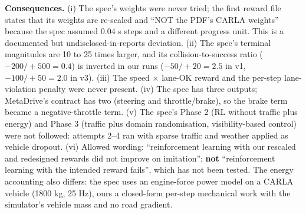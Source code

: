 \documentclass[10.5pt,a4paper]{article}
\begin{document}
\textbf{Consequences.} (i) The spec's weights were never tried; the first reward file states that its weights are re-scaled and ``NOT the PDF's CARLA weights'' because the spec assumed 0.04 s steps and a different progress unit. This is a documented but undisclosed-in-reports deviation. (ii) The spec's terminal magnitudes are 10 to 25 times larger, and its collision-to-success ratio ($-200/+500=0.4$) is inverted in our runs ($-50/+20=2.5$ in v1, $-100/+50=2.0$ in v3). (iii) The speed $\times$ lane-OK reward and the per-step lane-violation penalty were never present. (iv) The spec has three outputs; MetaDrive's contract has two (steering and throttle/brake), so the brake term became a negative-throttle term. (v) The spec's Phase 2 (RL without traffic plus energy) and Phase 3 (traffic plus domain randomisation, visibility-based control) were not followed: attempts 2--4 ran with sparse traffic and weather applied as vehicle dropout. (vi) Allowed wording: ``reinforcement learning with our rescaled and redesigned rewards did not improve on imitation''; \textbf{not} ``reinforcement learning with the intended reward fails'', which has not been tested. The energy accounting also differs: the spec uses an engine-force power model on a CARLA vehicle (1800 kg, 25 Hz), ours a closed-form per-step mechanical work with the simulator's vehicle mass and no road gradient.
\end{document}
